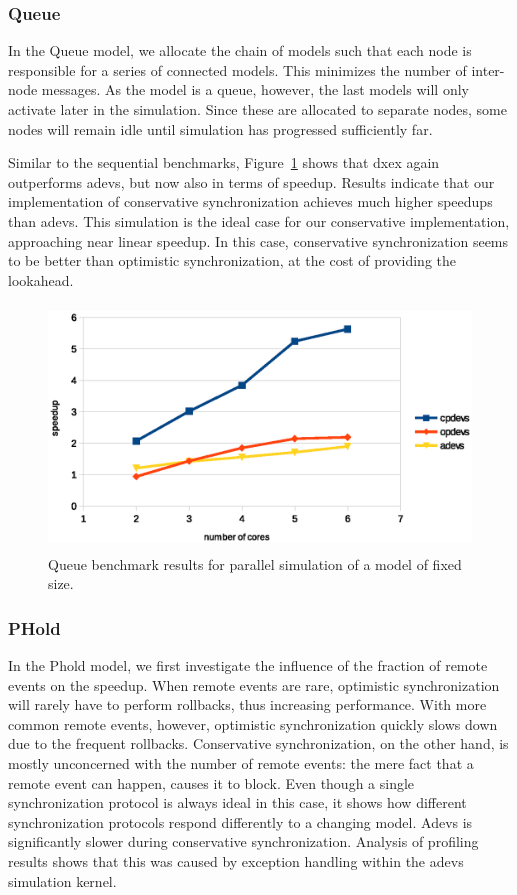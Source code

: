 \subsubsection{Queue}
In the Queue model, we allocate the chain of models such that each node is responsible for a series of connected models.
This minimizes the number of inter-node messages.
As the model is a queue, however, the last models will only activate later in the simulation.
Since these are allocated to separate nodes, some nodes will remain idle until simulation has progressed sufficiently far.

Similar to the sequential benchmarks, Figure~\ref{fig:queue_benchmark_parallel} shows that dxex again outperforms adevs, but now also in terms of speedup.
Results indicate that our implementation of conservative synchronization achieves much higher speedups than adevs.
This simulation is the ideal case for our conservative implementation, approaching near linear speedup.
In this case, conservative synchronization seems to be better than optimistic synchronization, at the cost of providing the lookahead.

\begin{figure}
	\includegraphics[width=\columnwidth,height=6.5cm]{fig/queue_parallel.eps}
	\caption{Queue benchmark results for parallel simulation of a model of fixed size.}
	\label{fig:queue_benchmark_parallel}
\end{figure}

\subsubsection{PHold}
In the Phold model, we first investigate the influence of the fraction of remote events on the speedup.
When remote events are rare, optimistic synchronization will rarely have to perform rollbacks, thus increasing performance.
With more common remote events, however, optimistic synchronization quickly slows down due to the frequent rollbacks.
Conservative synchronization, on the other hand, is mostly unconcerned with the number of remote events: the mere fact that a remote event can happen, causes it to block.
Even though a single synchronization protocol is always ideal in this case, it shows how different synchronization protocols respond differently to a changing model.
Adevs is significantly slower during conservative synchronization.
Analysis of profiling results shows that this was caused by exception handling within the adevs simulation kernel.

